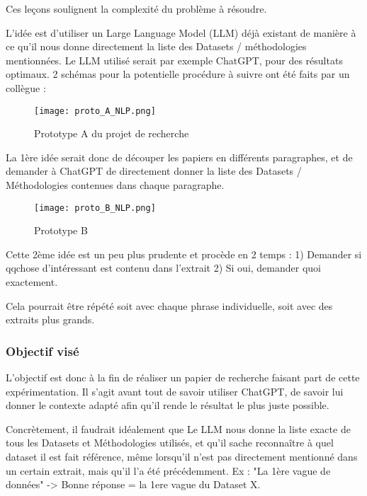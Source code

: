 Ces leçons soulignent la complexité du problème à résoudre.

L'idée est d'utiliser un Large Language Model (LLM) déjà existant de manière à ce qu'il nous donne directement la liste des Datasets / méthodologies mentionnées.
Le LLM utilisé serait par exemple ChatGPT, pour des résultats optimaux.
2 schémas pour la potentielle procédure à suivre ont été faits par un collègue :

\begin{figure}[H]
    \centering
    \texttt{[image: proto\_A\_NLP.png]}
    \caption{Prototype A du projet de recherche}
\end{figure}

La 1ère idée serait donc de découper les papiers en différents paragraphes, et de demander à ChatGPT de directement donner la liste des Datasets / Méthodologies contenues dans chaque paragraphe.

\begin{figure}[H]
    \centering
    \texttt{[image: proto\_B\_NLP.png]}
    \caption{Prototype B}
\end{figure}

Cette 2ème idée est un peu plus prudente et procède en 2 temps : 1) Demander si qqchose d'intéressant est contenu dans l'extrait
2) Si oui, demander quoi exactement.

Cela pourrait être répété soit avec chaque phrase individuelle, soit avec des extraits plus grands.


\subsubsection{Objectif visé}

L'objectif est donc à la fin de réaliser un papier de recherche faisant part de cette expérimentation.
Il s'agit avant tout de savoir utiliser ChatGPT, de savoir lui donner le contexte adapté afin qu'il rende le résultat le plus juste possible.

Concrètement, il faudrait idéalement que Le LLM nous donne la liste exacte de tous les Datasets et Méthodologies utilisés, et qu'il sache reconnaître à quel dataset il est fait référence, même lorsqu'il n'est pas directement mentionné dans un certain extrait, mais qu'il l'a été précédemment.
Ex : "La 1ère vague de données" -> Bonne réponse = la 1ere vague du Dataset X.